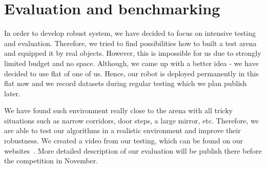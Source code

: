 \section{Evaluation and benchmarking}

In order to develop robust system, we have decided to focus on intensive testing and evaluation. 
Therefore, we tried to find possibilities how to built a test arena and equipped it by real objects.
However, this is impossible for us due to strongly limited budget and no space. 
Although, we came up with a better idea - we have decided to use flat of one of us. 
Hence, our robot is deployed permanently in this flat now and we record datasets during regular testing which we plan publish later. 

We have found such environment really close to the arena with all tricky situations such as narrow corridors, door steps, a large mirror, etc. 
Therefore, we are able to test our algorithms in a realistic environment and improve their robustness.
We created a video from our testing, which can be found on our websites~\cite{barc_web}. More detailed description of our evaluation will be publish there before the competition in November.